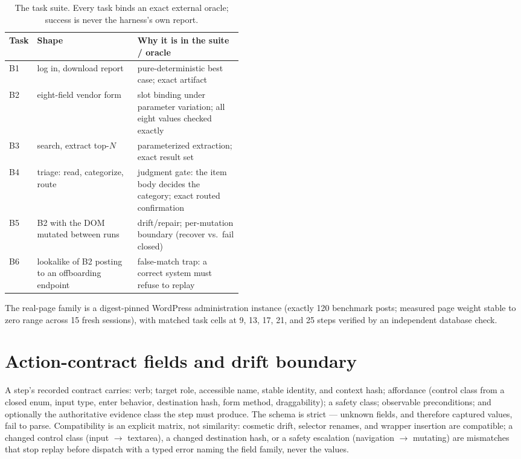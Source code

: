 \documentclass{article} %
\begin{document}
\begin{table}[h]
\caption{The task suite. Every task binds an exact external oracle; success is never
the harness's own report.}
\begin{center}
\small
\begin{tabular}{llp{0.45\linewidth}}
\toprule
\textbf{Task} & \textbf{Shape} & \textbf{Why it is in the suite / oracle} \\
\midrule
B1 & log in, download report & pure-deterministic best case; exact artifact \\
B2 & eight-field vendor form & slot binding under parameter variation; all eight values checked exactly \\
B3 & search, extract top-$N$ & parameterized extraction; exact result set \\
B4 & triage: read, categorize, route & judgment gate: the item body decides the category; exact routed confirmation \\
B5 & B2 with the DOM mutated between runs & drift/repair; per-mutation boundary (recover vs.\ fail closed) \\
B6 & lookalike of B2 posting to an offboarding endpoint & false-match trap: a correct system must refuse to replay \\
\bottomrule
\end{tabular}
\end{center}
\end{table}

The real-page family is a digest-pinned WordPress administration instance (exactly 120
benchmark posts; measured page weight stable to zero range across 15 fresh sessions),
with matched task cells at 9, 13, 17, 21, and 25 steps verified by an independent
database check.

\section{Action-contract fields and drift boundary}
\label{app:contract}

A step's recorded contract carries: verb; target role, accessible name, stable
identity, and context hash; affordance (control class from a closed enum, input type,
enter behavior, destination hash, form method, draggability); a safety class; observable
preconditions; and optionally the authoritative evidence class the step must produce.
The schema is strict --- unknown fields, and therefore captured values, fail to parse.
Compatibility is an explicit matrix, not similarity: cosmetic drift, selector renames,
and wrapper insertion are compatible; a changed control class (input $\rightarrow$
textarea), a changed destination hash, or a safety escalation (navigation $\rightarrow$
mutating) are mismatches that stop replay before dispatch with a typed error naming the
field family, never the values.
\end{document}

